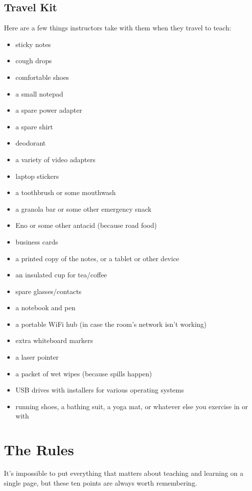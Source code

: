 \documentclass[10pt,statementpaper]{memoir}
\providecommand{\tightlist}{%
  \setlength{\itemsep}{0pt}\setlength{\parskip}{0pt}}
\begin{document}
\section{Travel Kit}\label{travel-kit}

Here are a few things instructors take with them when they travel to
teach:

\begin{itemize}
\tightlist
\item
  sticky notes
\item
  cough drops
\item
  comfortable shoes
\item
  a small notepad
\item
  a spare power adapter
\item
  a spare shirt
\item
  deodorant
\item
  a variety of video adapters
\item
  laptop stickers
\item
  a toothbrush or some mouthwash
\item
  a granola bar or some other emergency snack
\item
  Eno or some other antacid (because road food)
\item
  business cards
\item
  a printed copy of the notes, or a tablet or other device
\item
  an insulated cup for tea/coffee
\item
  spare glasses/contacts
\item
  a notebook and pen
\item
  a portable WiFi hub (in case the room's network isn't working)
\item
  extra whiteboard markers
\item
  a laser pointer
\item
  a packet of wet wipes (because spills happen)
\item
  USB drives with installers for various operating systems
\item
  running shoes, a bathing suit, a yoga mat, or whatever else you
  exercise in or with
\end{itemize}

\chapter{The Rules}\label{the-rules}

It's impossible to put everything that matters about teaching and
learning on a single page, but these ten points are always worth
remembering.
\end{document}
